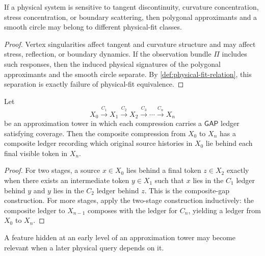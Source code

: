 \begin{corollary}
\label{cor:hidden-vertices-physically-relevant}
If a physical system is sensitive to tangent discontinuity, curvature concentration, stress concentration, or boundary scattering, then polygonal approximants and a smooth circle may belong to different physical-fit classes.
\end{corollary}

\begin{proof}
Vertex singularities affect tangent and curvature structure and may affect stress, reflection, or boundary dynamics. If the observation bundle $\Pi$ includes such responses, then the induced physical signatures of the polygonal approximants and the smooth circle separate. By \autoref{def:physical-fit-relation}, this separation is exactly failure of physical-fit equivalence.
\end{proof}

\begin{theorem}
\label{thm:composite-towers-retain-source-dependence}
Let
$$
X_0\xrightarrow{C_1}X_1\xrightarrow{C_2}X_2\xrightarrow{C_3}\cdots\xrightarrow{C_n}X_n
$$
be an approximation tower in which each compression carries a $\mathsf{GAP}$ ledger satisfying coverage. Then the composite compression from $X_0$ to $X_n$ has a composite ledger recording which original source histories in $X_0$ lie behind each final visible token in $X_n$.
\end{theorem}

\begin{proof}
For two stages, a source $x\in X_0$ lies behind a final token $z\in X_2$ exactly when there exists an intermediate token $y\in X_1$ such that $x$ lies in the $C_1$ ledger behind $y$ and $y$ lies in the $C_2$ ledger behind $z$. This is the composite-gap construction. For more stages, apply the two-stage construction inductively: the composite ledger to $X_{n-1}$ composes with the ledger for $C_n$, yielding a ledger from $X_0$ to $X_n$.
\end{proof}

\begin{corollary}
\label{cor:hidden-source-structure-physically-active}
A feature hidden at an early level of an approximation tower may become relevant when a later physical query depends on it.
\end{corollary}

